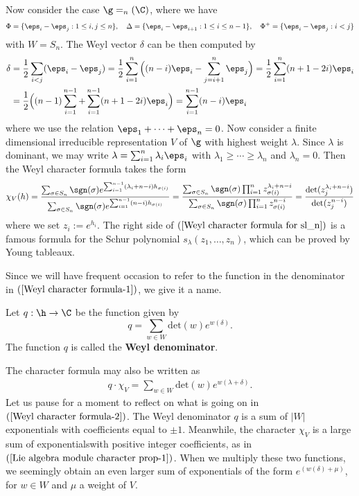 \begin{example}
Now consider the case $\g=\sl_n(\C)$, where we have
\[\Phi=\{\eps_i-\eps_j:1\leq i,j\leq n\},\quad \Delta=\{\eps_i-\eps_{i+1}:1\leq i\leq n-1\},\quad \Phi^+=\{\eps_i-\eps_j:i<j\}\]
with $W=S_n$. The Weyl vector $\delta$ can be then computed by
\begin{align*}
\delta&=\frac{1}{2}\sum_{i<j}(\eps_i-\eps_j)=\frac{1}{2}\sum_{i=1}^{n}\Big((n-i)\eps_i-\sum_{j=i+1}^{n}\eps_j\Big)=\frac{1}{2}\sum_{i=1}^{n}(n+1-2i)\eps_i\\
&=\frac{1}{2}\Big((n-1)\sum_{i=1}^{n-1}+\sum_{i=1}^{n-1}(n+1-2i)\eps_i\Big)=\sum_{i=1}^{n-1}(n-i)\eps_i
\end{align*}
where we use the relation $\eps_1+\cdots+\eps_n=0$. Now consider a finite dimensional irreducible representation $V$ of $\g$ with highest weight $\lambda$. Since $\lambda$ is dominant, we may write $\lambda=\sum_{i=1}^{n}\lambda_i\eps_i$ with $\lambda_1\geq\cdots\geq\lambda_n$ and $\lambda_n=0$. Then the Weyl character formula takes the form
\begin{align}\label{Weyl character formula for sl_n}
\chi_V(h)=\frac{\sum_{\sigma\in S_n}\sgn(\sigma)e^{\sum_{i=1}^{n-1}(\lambda_i+n-i)h_{\sigma(i)}}}{\sum_{\sigma\in S_n}\sgn(\sigma)e^{\sum_{i=1}^{n-1}(n-i)h_{\sigma(i)}}}=\frac{\sum_{\sigma\in S_n}\sgn(\sigma)\prod_{i=1}^{n}z_{\sigma(i)}^{\lambda_i+n-i}}{\sum_{\sigma\in S_n}\sgn(\sigma)\prod_{i=1}^{n}z_{\sigma(i)}^{n-i}}=\frac{\det(z_j^{\lambda_i+n-i})}{\det(z_j^{n-i})}
\end{align}
where we set $z_i:=e^{h_i}$. The right side of $(\ref{Weyl character formula for sl_n})$ is a famous formula for the Schur polynomial $s_\lambda(z_1,\dots,z_n)$, which can be proved by Young tableaux.
\end{example}
Since we will have frequent occasion to refer to the function in the denominator in $(\ref{Weyl character formula-1})$, we give it a name.
\begin{definition}
Let $q:\h\to\C$ be the function given by
\[q=\sum_{w\in W}\mathrm{det}(w) e^{w(\delta)}.\]
The function $q$ is called the \textbf{Weyl denominator}.
\end{definition}
The character formula may also be written as
\begin{align}\label{Weyl character formula-2}
q\cdot\chi_V=\sum_{w\in W}\mathrm{det}(w) e^{w(\lambda+\delta)}.
\end{align}
Let us pause for a moment to reflect on what is going on in $(\ref{Weyl character formula-2})$. The Weyl denominator $q$ is a sum of $|W|$ exponentials with coefficients equal to $\pm 1$. Meanwhile, the character $\chi_V$ is a large sum of exponentialswith positive integer coefficients, as in $(\ref{Lie algebra module character prop-1})$. When we multiply these two functions, we seemingly obtain an even larger sum of exponentials of the form $e^{(w(\delta)+\mu)}$, for $w\in W$ and $\mu$ a weight of $V$.\par
